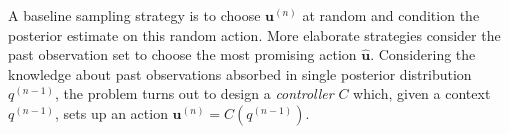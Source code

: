 \documentclass{article}
\begin{document}
A baseline sampling strategy is to choose $\boldsymbol{u}^{(n)}$ at random and condition the posterior  estimate on this random action. 
More elaborate strategies consider the past observation set
to choose the most promising action $\hat{\boldsymbol{u}}$. %
Considering the knowledge about past observations absorbed in single posterior distribution $q^{(n-1)}$, the problem turns out to design  a \emph{controller} $C$ which, given a context $q^{(n-1)}$, sets up an action $\boldsymbol{u}^{(n)} = C(q^{(n-1)})$. 
\end{document}
